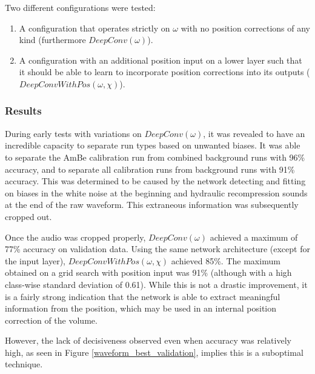 \documentclass[10pt]{article}
\begin{document}
Two different configurations were tested:
\begin{enumerate}
    \item A configuration that operates strictly on $\omega$ with no position corrections of any kind (furthermore $DeepConv(\omega)$).
    \item A configuration with an additional position input on a lower layer such that it should be able to learn to incorporate position corrections into its outputs ($DeepConvWithPos(\omega, \chi)$).
\end{enumerate}

\subsubsection{Results}

During early tests with variations on $DeepConv(\omega)$, it was revealed to have an incredible capacity to separate run types based on unwanted biases. It was able to separate the AmBe calibration run from combined background runs with 96\% accuracy, and to separate all calibration runs from background runs with 91\% accuracy. This was determined to be caused by the network detecting and fitting on biases in the white noise at the beginning and hydraulic recompression sounds at the end of the raw waveform. This extraneous information was subsequently cropped out.

Once the audio was cropped properly, $DeepConv(\omega)$ achieved a maximum of 77\% accuracy on validation data. Using the same network architecture (except for the input layer), $DeepConvWithPos(\omega, \chi)$ achieved 85\%. The maximum obtained on a grid search with position input was 91\% (although with a high class-wise standard deviation of 0.61). While this is not a drastic improvement, it is a fairly strong indication that the network is able to extract meaningful information from the position, which may be used in an internal position correction of the volume.

However, the lack of decisiveness observed even when accuracy was relatively high, as seen in Figure \ref{waveform_best_validation}, implies this is a suboptimal technique.
\end{document}
